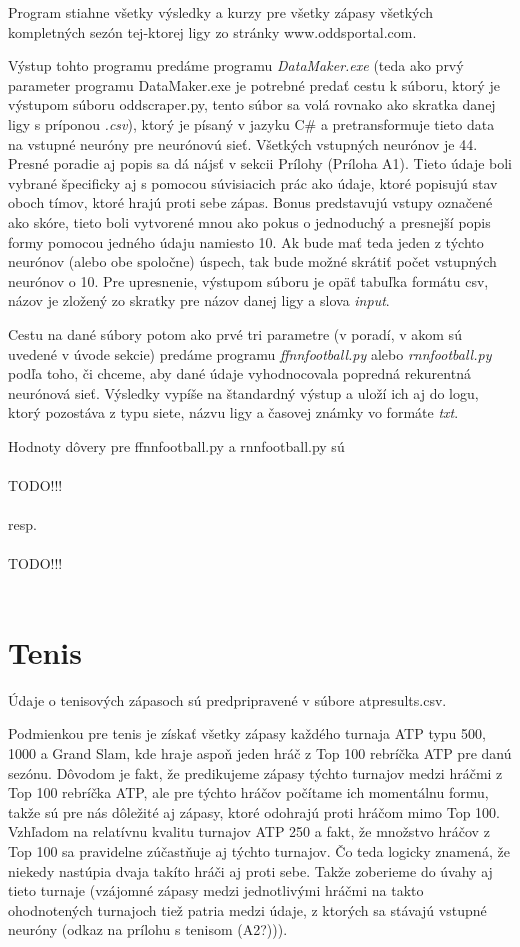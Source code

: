 Program stiahne všetky výsledky a kurzy pre všetky zápasy všetkých kompletných sezón tej-ktorej ligy zo stránky www.oddsportal.com.

Výstup tohto programu predáme programu \textit{DataMaker.exe} (teda ako prvý parameter programu DataMaker.exe je potrebné predať cestu k súboru, ktorý je výstupom súboru oddscraper.py, tento súbor sa volá rovnako ako skratka danej ligy s príponou \textit{.csv}), ktorý je písaný v jazyku C\# a pretransformuje tieto data na vstupné neuróny pre neurónovú sieť. 
Všetkých vstupných neurónov je 44. 
Presné poradie aj popis sa dá nájsť v sekcii Prílohy (Príloha A1).
Tieto údaje boli vybrané špecificky aj s pomocou súvisiacich prác ako údaje, ktoré popisujú stav oboch tímov, ktoré hrajú proti sebe zápas. 
Bonus predstavujú vstupy označené ako skóre, tieto boli vytvorené mnou ako pokus o jednoduchý a presnejší popis formy pomocou jedného údaju namiesto 10.
Ak bude mať teda jeden z týchto neurónov (alebo obe spoločne) úspech, tak bude možné skrátiť počet vstupných neurónov o 10.
Pre upresnenie, výstupom súboru je opäť tabuľka formátu csv, názov je zložený zo skratky pre názov danej ligy a slova \textit{input}.

Cestu na dané súbory potom ako prvé tri parametre (v poradí, v akom sú uvedené v úvode sekcie) predáme programu \textit{ffnnfootball.py} alebo \textit{rnnfootball.py} podľa toho, či chceme, aby dané údaje vyhodnocovala popredná rekurentná neurónová sieť.
Výsledky vypíše na štandardný výstup a uloží ich aj do logu, ktorý pozostáva z typu siete, názvu ligy a časovej známky vo formáte \textit{txt}.

Hodnoty dôvery pre ffnnfootball.py a rnnfootball.py sú \\\\
TODO!!!\\\\
resp.\\\\
TODO!!!\\\\

\section{Tenis}
Údaje o tenisových zápasoch sú predpripravené v súbore atpresults.csv.

Podmienkou pre tenis je získať všetky zápasy každého turnaja ATP typu 500, 1000 a Grand Slam, kde hraje aspoň jeden hráč z Top 100 rebríčka ATP pre danú sezónu.
Dôvodom je fakt, že predikujeme zápasy týchto turnajov medzi hráčmi z Top 100 rebríčka ATP, ale pre týchto hráčov počítame ich momentálnu formu, takže sú pre nás dôležité aj zápasy, ktoré odohrajú proti hráčom mimo Top 100.
Vzhľadom na relatívnu kvalitu turnajov ATP 250 a fakt, že množstvo hráčov z Top 100 sa pravidelne zúčastňuje aj týchto turnajov. 
Čo teda logicky znamená, že niekedy nastúpia dvaja takíto hráči aj proti sebe. 
Takže zoberieme do úvahy aj tieto turnaje (vzájomné zápasy medzi jednotlivými hráčmi na takto ohodnotených turnajoch tiež patria medzi údaje, z ktorých sa stávajú vstupné neuróny (odkaz na prílohu s tenisom (A2?))). 

